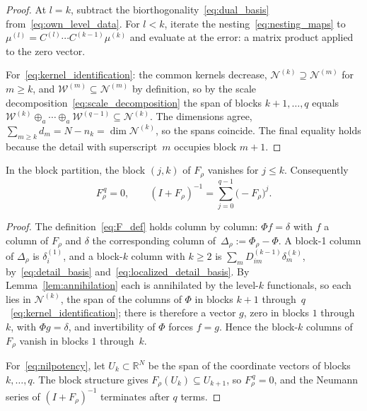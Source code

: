 \documentclass[hidelinks]{siamart}
\theoremstyle{nonumberplain}
\numberwithin{theorem}{section}
\begin{document}
\begin{proof}
At $l = k$, subtract the biorthogonality~\eqref{eq:dual_basis}
from~\eqref{eq:own_level_data}.  For $l < k$, iterate the
nesting~\eqref{eq:nesting_maps} to
$\mu^{(l)} = C^{(l)} \cdots C^{(k-1)} \mu^{(k)}$ and evaluate at the
error: a matrix product applied to the zero vector.

For~\eqref{eq:kernel_identification}: the common kernels decrease,
$\mathcal{N}^{(k)} \supseteq \mathcal{N}^{(m)}$ for $m \geq k$, and
$\mathcal{W}^{(m)} \subseteq \mathcal{N}^{(m)}$ by definition, so by the
scale decomposition~\eqref{eq:scale_decomposition} the span of blocks
$k+1, \ldots, q$ equals $\mathcal{W}^{(k)} \oplus_a \cdots \oplus_a
\mathcal{W}^{(q-1)} \subseteq \mathcal{N}^{(k)}$.  The dimensions agree,
$\sum_{m \geq k} d_m = N - n_k = \dim \mathcal{N}^{(k)}$, so the spans
coincide.  The final equality holds because the detail with
superscript~$m$ occupies block $m+1$.
\end{proof}

\begin{lemma}\label{lem:nilpotent}
In the block partition, the block $(j, k)$ of $F_\rho$ vanishes for
$j \leq k$.  Consequently
\begin{equation}\label{eq:nilpotency}
  F_\rho^{\,q} = 0,
  \qquad
  (I + F_\rho)^{-1} = \sum_{j=0}^{q-1} \bigl(-F_\rho\bigr)^{j} .
\end{equation}
\end{lemma}

\begin{proof}
The definition~\eqref{eq:F_def} holds column by column: $\Phi f = \delta$
with $f$ a column of $F_\rho$ and $\delta$ the corresponding column
of~$\Delta_\rho := \Phi_\rho - \Phi$.  A block-1 column of $\Delta_\rho$
is $\delta^{(1)}_i$, and a block-$k$ column with $k \geq 2$ is
$\sum_m D^{(k-1)}_{im} \delta^{(k)}_m$, by~\eqref{eq:detail_basis}
and~\eqref{eq:localized_detail_basis}.  By Lemma~\ref{lem:annihilation}
each is annihilated by the level-$k$ functionals, so each lies in
$\mathcal{N}^{(k)}$, the span of the columns of $\Phi$ in blocks $k+1$
through~$q$~\eqref{eq:kernel_identification}; there is therefore a
vector $g$, zero in blocks $1$ through~$k$, with $\Phi g = \delta$, and
invertibility of $\Phi$ forces $f = g$.  Hence the block-$k$ columns of
$F_\rho$ vanish in blocks $1$ through~$k$.

For~\eqref{eq:nilpotency}, let $U_k \subset \mathbb{R}^N$ be the span
of the coordinate vectors of blocks $k, \ldots, q$.  The block structure
gives $F_\rho(U_k) \subseteq U_{k+1}$, so $F_\rho^{\,q} = 0$, and the
Neumann series of $(I+F_\rho)^{-1}$ terminates after $q$ terms.
\end{proof}
\end{document}
